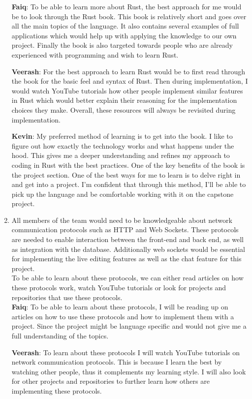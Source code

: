 \documentclass[12pt, titlepage]{article}
\begin{document}
\begin{enumerate}
		\textbf{Faiq}: To be able to learn more about Rust, the best approach for me would be to look through the Rust book. This book is relatively short and goes over all the main topics of the language. It also contains several examples of full applications which would help up with applying the knowledge to our own project. Finally the book is also targeted towards people who are already experienced with programming and wish to learn Rust.
		
		\textbf{Veerash}: For the best approach to learn Rust would be to first read through the book for the basic feel and syntax of Rust. Then during implementation, I would watch YouTube tutorials how other people implement similar features in Rust which would better explain their reasoning for the implementation choices they make. Overall, these resources will always be revisited during implementation.
		
		\textbf{Kevin}: My preferred method of learning is to get into the book. I like to figure out how exactly the technology works and what happens under the hood. This gives me a deeper understanding and refines my approach to coding in Rust with the best practices. One of the key benefits of the book is the project section. One of the best ways for me to learn is to delve right in and get into a project. I'm confident that through this method, I'll be able to pick up the language and be comfortable working with it on the capstone project.
		
		\item All members of the team would need to be knowledgeable about network communication protocols such as HTTP and Web Sockets. These protocols are needed to enable interaction between the front-end and back end, as well as integration with the database. Additionally web sockets would be essential for implementing the live editing features as well as the chat feature for this project.\\
		
		To be able to learn about these protocols, we can either read articles on how these protocols work, watch YouTube tutorials or look for projects and repositories that use these protocols.\\
		
		\textbf{Faiq}: To be able to learn about these protocols, I will be reading up on articles on how to use these protocols and how to implement them with a project. Since the project might be language specific and would not give me a full understanding of the topics.
		
		\textbf{Veerash}: To learn about these protocols I will watch YouTube tutorials on network communication protocols. This is because I learn the best by watching other people, thus it complements my learning style. I will also look for other projects and repositories to further learn how others are implementing these protocols.
		
	\end{enumerate}
	
\end{document}
